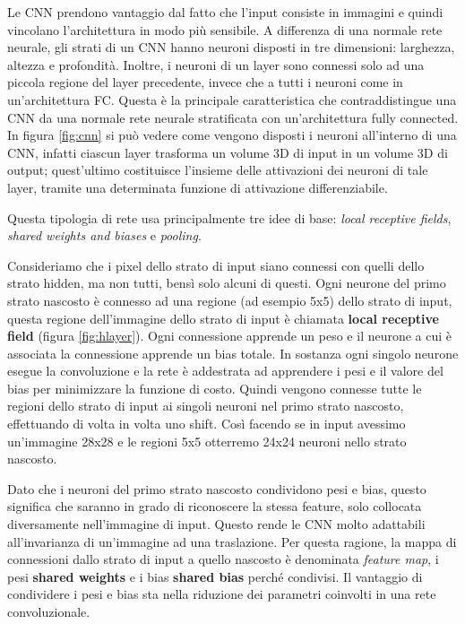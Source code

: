 \documentclass[twoside,twocolumn,10pt]{extarticle}
\theoremstyle{definition}
\begin{document}
Le CNN prendono vantaggio dal fatto che l'input consiste in immagini e quindi vincolano l'architettura in modo più sensibile. A differenza di una normale rete neurale, gli strati di un CNN hanno neuroni disposti in tre dimensioni: larghezza, altezza e profondità. Inoltre, i neuroni di un layer sono connessi solo ad una piccola regione del layer precedente, invece che a tutti i neuroni come in un'architettura FC.
Questa è la principale caratteristica che contraddistingue una CNN da una normale rete neurale stratificata con un'architettura fully connected. In figura \ref{fig:cnn} si può vedere come vengono disposti i neuroni all'interno di una CNN, infatti ciascun layer trasforma un volume 3D di input in un volume 3D di output; quest'ultimo costituisce l'insieme delle attivazioni dei neuroni di tale layer, tramite una determinata funzione di attivazione differenziabile.

Questa tipologia di rete usa principalmente tre idee di base: \textit{local receptive fields}, \textit{shared weights and biases} e \textit{pooling}. 

Consideriamo che i pixel dello strato di input siano connessi con quelli dello strato hidden, ma non tutti, bensì solo alcuni di questi. Ogni neurone del primo strato nascosto è connesso ad una regione (ad esempio 5x5) dello strato di input, questa regione dell'immagine dello strato di input è chiamata \textbf{local receptive field} (figura \ref{fig:hlayer}). Ogni connessione apprende un peso e il neurone a cui è associata la connessione apprende un bias totale. In sostanza ogni singolo neurone esegue la convoluzione e la rete è addestrata ad apprendere i pesi e il valore del bias per minimizzare la funzione di costo. Quindi vengono connesse tutte le regioni dello strato di input ai singoli neuroni nel primo strato nascosto, effettuando di volta in volta uno shift. Così facendo se in input avessimo un'immagine 28x28 e le regioni 5x5 otterremo 24x24 neuroni nello strato nascosto.

Dato che i neuroni del primo strato nascosto condividono pesi e bias, questo significa che saranno in grado di riconoscere la stessa feature, solo collocata diversamente nell'immagine di input. Questo rende le CNN molto adattabili all'invarianza di un'immagine ad una traslazione. Per questa ragione, la mappa di connessioni dallo strato di input a quello nascosto è denominata \textit{feature map}, i pesi \textbf{shared weights} e i bias \textbf{shared bias} perché condivisi. Il vantaggio di condividere i pesi e bias sta nella riduzione dei parametri coinvolti in una rete convoluzionale.
\end{document}
